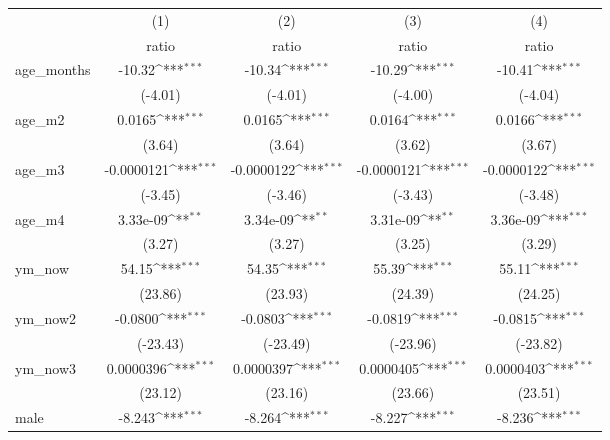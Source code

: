 {
\def\sym#1{\ifmmode^{#1}\else\(^{#1}\)\fi}
\begin{tabular}{l*{4}{c}}
\hline\hline
                    &\multicolumn{1}{c}{(1)}&\multicolumn{1}{c}{(2)}&\multicolumn{1}{c}{(3)}&\multicolumn{1}{c}{(4)}\\
                    &\multicolumn{1}{c}{ratio}&\multicolumn{1}{c}{ratio}&\multicolumn{1}{c}{ratio}&\multicolumn{1}{c}{ratio}\\
\hline
age\_months          &      -10.32\sym{***}&      -10.34\sym{***}&      -10.29\sym{***}&      -10.41\sym{***}\\
                    &     (-4.01)         &     (-4.01)         &     (-4.00)         &     (-4.04)         \\
age\_m2              &      0.0165\sym{***}&      0.0165\sym{***}&      0.0164\sym{***}&      0.0166\sym{***}\\
                    &      (3.64)         &      (3.64)         &      (3.62)         &      (3.67)         \\
age\_m3              &  -0.0000121\sym{***}&  -0.0000122\sym{***}&  -0.0000121\sym{***}&  -0.0000122\sym{***}\\
                    &     (-3.45)         &     (-3.46)         &     (-3.43)         &     (-3.48)         \\
age\_m4              &    3.33e-09\sym{**} &    3.34e-09\sym{**} &    3.31e-09\sym{**} &    3.36e-09\sym{***}\\
                    &      (3.27)         &      (3.27)         &      (3.25)         &      (3.29)         \\
ym\_now              &       54.15\sym{***}&       54.35\sym{***}&       55.39\sym{***}&       55.11\sym{***}\\
                    &     (23.86)         &     (23.93)         &     (24.39)         &     (24.25)         \\
ym\_now2             &     -0.0800\sym{***}&     -0.0803\sym{***}&     -0.0819\sym{***}&     -0.0815\sym{***}\\
                    &    (-23.43)         &    (-23.49)         &    (-23.96)         &    (-23.82)         \\
ym\_now3             &   0.0000396\sym{***}&   0.0000397\sym{***}&   0.0000405\sym{***}&   0.0000403\sym{***}\\
                    &     (23.12)         &     (23.16)         &     (23.66)         &     (23.51)         \\
male                &      -8.243\sym{***}&      -8.264\sym{***}&      -8.227\sym{***}&      -8.236\sym{***}\\

\end{tabular}}
